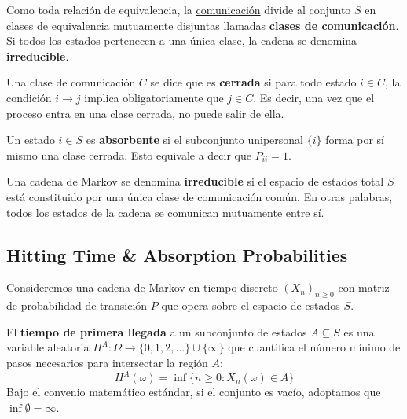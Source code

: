 \documentclass[10pt]{book}
\begin{document}
\begin{observacion}
    Como toda relación de equivalencia, la \underline{comunicación} divide al conjunto $S$ en clases de equivalencia mutuamente disjuntas llamadas \textbf{clases de comunicación}. Si todos los estados pertenecen a una única clase, la cadena se denomina \textbf{irreducible}.
\end{observacion}

\begin{definicion}
    Una clase de comunicación $C$ se dice que es \textbf{cerrada} si para todo estado $i \in C$, la condición $i \to j$ implica obligatoriamente que $j \in C$. Es decir, una vez que el proceso entra en una clase cerrada, no puede salir de ella.
\end{definicion}

\begin{definicion}
    Un estado $i \in S$ es \textbf{absorbente} si el subconjunto unipersonal $\{i\}$ forma por sí mismo una clase cerrada. Esto equivale a decir que $P_{ii} = 1$.
\end{definicion}

\begin{definicion}[Irreducibilidad]
    Una cadena de Markov se denomina \textbf{irreducible} si el espacio de estados total $S$ está constituido por una única clase de comunicación común. En otras palabras, todos los estados de la cadena se comunican mutuamente entre sí.
\end{definicion}

\subsection{Hitting Time \& Absorption Probabilities}
\noindent
Consideremos una cadena de Markov en tiempo discreto $(X_n)_{n \geq 0}$ con matriz de probabilidad de transición $P$ que opera sobre el espacio de estados $S$.

\begin{definicion}
    El \textbf{tiempo de primera llegada} a un subconjunto de estados $A \subseteq S$ es una variable aleatoria $H^A: \Omega \to \{0, 1, 2, \dots\} \cup \{\infty\}$ que cuantifica el número mínimo de pasos necesarios para intersectar la región $A$:
    \[ 
    H^A(\omega) = \inf\{n \geq 0 : X_n(\omega) \in A\} 
    \]
    Bajo el convenio matemático estándar, si el conjunto es vacío, adoptamos que $\inf \emptyset = \infty$.
\end{definicion}
\end{document}
